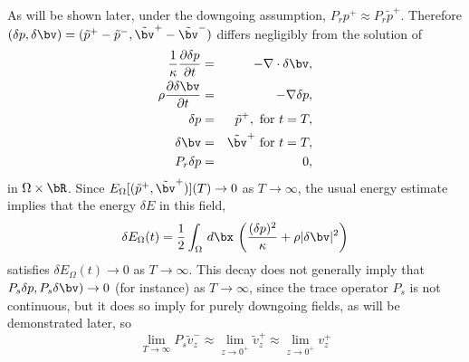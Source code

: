 As will be shown later, under the downgoing assumption, $P_r p^+
\approx P_r \tilde{p}^+$.
Therefore $(\delta p,\delta \bv)=(\tilde{p}^+-\tilde{p}^-,\tilde{\bv}^+-\tilde{\bv}^-)$
differs negligibly from the solution of
\begin{eqnarray}
\label{eqn:deltaawe}
  \frac{1}{\kappa}\frac{\partial \delta p}{\partial t} & = & -
                                                               \nabla
                                                               \cdot
                                                               \delta \bv, \nonumber \\
  \rho\frac{\partial \delta \bv}{\partial t} & = & - \nabla \delta p,\nonumber \\
  \delta p & =& \tilde{p}^+,  \mbox{ for } t=T,\nonumber\\ 
  \delta \bv & = & \tilde{\bv}^+ \mbox{ for } t=T,\nonumber\\
  P_r\delta p & = & 0,
\end{eqnarray}
in $\Omega \times \bR$. Since
$E_{\Omega}[(\tilde{p}^+,\tilde{\bv}^+)](T) \rightarrow 0$ as $T
\rightarrow \infty$, the usual energy estimate implies that the energy $\delta
E$ in this field,
\[
  \delta E_{\Omega}(t) = \frac{1}{2} \int_{\Omega} \,d\bx \,
 \left(\frac{(\delta p)^2}{\kappa} + \rho |\delta \bv|^2\right)
\]
satisfies $\delta E_{\Omega}(t) \rightarrow 0$ as $T \rightarrow
\infty$. This decay does not generally imply that $P_s\delta p, P_s \delta \bv)
\rightarrow 0$ (for instance) as $T \rightarrow \infty$, since the trace operator
$P_s$ is not continuous, but it does so imply for purely downgoing
fields, as will be demonstrated later, so
\begin{equation}
  \label{eqn:approxinv0}
  \lim_{T \rightarrow \infty} P_s\tilde{v}_z^- \approx \lim_{z \rightarrow
    0^+}\tilde{v}_z^+ \approx \lim_{z \rightarrow 0^+}v^+_z
\end{equation}
  
